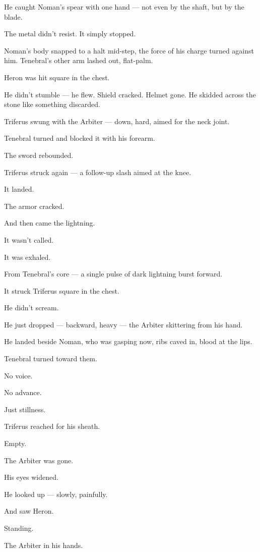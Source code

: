 \documentclass[12pt]{article}
\begin{document}
\bigskip

He caught Noman’s spear with one hand — not even by the shaft, but by the blade.

The metal didn’t resist. It simply stopped.

Noman’s body snapped to a halt mid-step, the force of his charge turned against him. Tenebral’s other arm lashed out, flat-palm.

Heron was hit square in the chest.

He didn’t stumble — he flew. Shield cracked. Helmet gone. He skidded across the stone like something discarded.

Triferus swung with the Arbiter — down, hard, aimed for the neck joint.

Tenebral turned and blocked it with his forearm.

The sword rebounded.

Triferus struck again — a follow-up slash aimed at the knee.

It landed.

The armor cracked.

And then came the lightning.

\bigskip

It wasn’t called.

It was exhaled.

From Tenebral’s core — a single pulse of dark lightning burst forward.

It struck Triferus square in the chest.

He didn’t scream.

He just dropped — backward, heavy — the Arbiter skittering from his hand.

He landed beside Noman, who was gasping now, ribs caved in, blood at the lips.

Tenebral turned toward them.

No voice.

No advance.

Just stillness.

\bigskip

Triferus reached for his sheath.

Empty.

The Arbiter was gone.

His eyes widened.

He looked up — slowly, painfully.

And saw Heron.

Standing.

The Arbiter in his hands.
\end{document}

